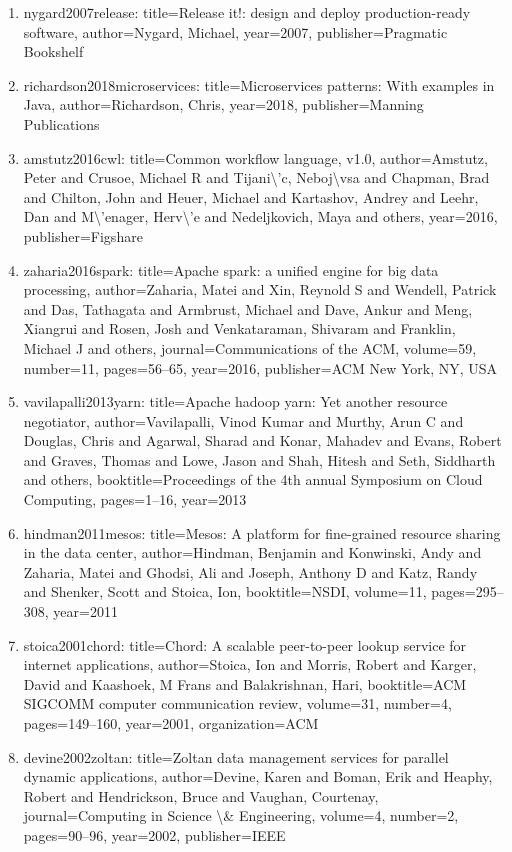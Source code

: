 \documentclass[11pt]{article}
\begin{document}
\begin{enumerate}[leftmargin=*]
  \item nygard2007release: title=Release it!: design and deploy production-ready software, author=Nygard, Michael, year=2007, publisher=Pragmatic Bookshelf
  \item richardson2018microservices: title=Microservices patterns: With examples in Java, author=Richardson, Chris, year=2018, publisher=Manning Publications
  \item amstutz2016cwl: title=Common workflow language, v1.0, author=Amstutz, Peter and Crusoe, Michael R and Tijani\textbackslash{}'c, Neboj\textbackslash{}vsa and Chapman, Brad and Chilton, John and Heuer, Michael and Kartashov, Andrey and Leehr, Dan and M\textbackslash{}'enager, Herv\textbackslash{}'e and Nedeljkovich, Maya and others, year=2016, publisher=Figshare
  \item zaharia2016spark: title=Apache spark: a unified engine for big data processing, author=Zaharia, Matei and Xin, Reynold S and Wendell, Patrick and Das, Tathagata and Armbrust, Michael and Dave, Ankur and Meng, Xiangrui and Rosen, Josh and Venkataraman, Shivaram and Franklin, Michael J and others, journal=Communications of the ACM, volume=59, number=11, pages=56--65, year=2016, publisher=ACM New York, NY, USA
  \item vavilapalli2013yarn: title=Apache hadoop yarn: Yet another resource negotiator, author=Vavilapalli, Vinod Kumar and Murthy, Arun C and Douglas, Chris and Agarwal, Sharad and Konar, Mahadev and Evans, Robert and Graves, Thomas and Lowe, Jason and Shah, Hitesh and Seth, Siddharth and others, booktitle=Proceedings of the 4th annual Symposium on Cloud Computing, pages=1--16, year=2013
  \item hindman2011mesos: title=Mesos: A platform for fine-grained resource sharing in the data center, author=Hindman, Benjamin and Konwinski, Andy and Zaharia, Matei and Ghodsi, Ali and Joseph, Anthony D and Katz, Randy and Shenker, Scott and Stoica, Ion, booktitle=NSDI, volume=11, pages=295--308, year=2011
  \item stoica2001chord: title=Chord: A scalable peer-to-peer lookup service for internet applications, author=Stoica, Ion and Morris, Robert and Karger, David and Kaashoek, M Frans and Balakrishnan, Hari, booktitle=ACM SIGCOMM computer communication review, volume=31, number=4, pages=149--160, year=2001, organization=ACM
  \item devine2002zoltan: title=Zoltan data management services for parallel dynamic applications, author=Devine, Karen and Boman, Erik and Heaphy, Robert and Hendrickson, Bruce and Vaughan, Courtenay, journal=Computing in Science \textbackslash{}\& Engineering, volume=4, number=2, pages=90--96, year=2002, publisher=IEEE

\end{enumerate}
\end{document}
